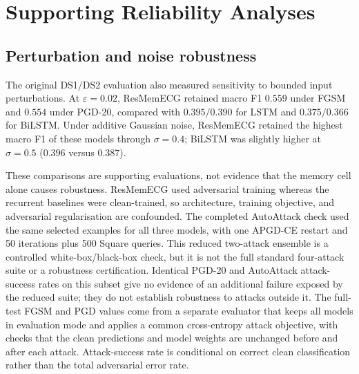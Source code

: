 \documentclass[review,12pt]{elsarticle}
\begin{document}
\section{Supporting Reliability Analyses}
\subsection{Perturbation and noise robustness}
The original DS1/DS2 evaluation also measured sensitivity to bounded input
perturbations. At $\varepsilon=0.02$,
ResMemECG retained macro F1 $0.559$ under FGSM and $0.554$ under PGD-20,
compared with $0.395/0.390$ for LSTM and $0.375/0.366$ for BiLSTM. Under
additive Gaussian noise, ResMemECG retained
the highest macro F1 of these models through $\sigma=0.4$; BiLSTM was slightly
higher at $\sigma=0.5$ ($0.396$ versus $0.387$).

\begin{table}[htbp]
\caption{Supporting adversarial-robustness evaluation on the conventional DS2
test set. FGSM and PGD-20 use $\varepsilon=0.02$. The completed AutoAttack
comparison used a separate shared 71-sample stratified subset and a custom
$L_\infty$ ensemble at $\varepsilon=0.02$ (APGD-CE and Square), so its values
are not directly interchangeable with the full-test values.}
\label{tab:adversarial-summary}
\centering
\small
\setlength{\tabcolsep}{3pt}
\end{table}

These comparisons are supporting evaluations, not evidence that the memory cell
alone causes robustness. ResMemECG used adversarial training whereas the
recurrent baselines were clean-trained, so architecture, training objective, and
adversarial regularisation are confounded. The completed AutoAttack check used
the same selected examples for all three models, with one APGD-CE restart and
50 iterations plus 500 Square queries. This reduced two-attack ensemble is a
controlled white-box/black-box check, but it is not the full standard four-attack
suite or a robustness certification. Identical PGD-20 and AutoAttack attack-
success rates on this subset give no evidence of an additional failure exposed
by the reduced suite; they do not establish robustness to attacks outside it.
The full-test FGSM and PGD values come from a separate evaluator that keeps all
models in evaluation mode and applies a common cross-entropy attack objective,
with checks that the clean predictions and model weights are unchanged before
and after each attack. Attack-success rate is conditional on correct clean
classification rather than the total adversarial error rate.
\end{document}
